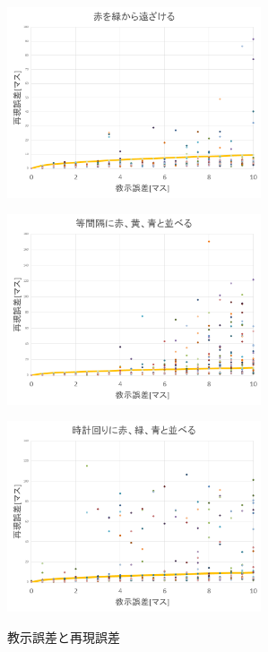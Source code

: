 \begin{figure}[h]
\begin{minipage}[t]{.49\textwidth}
		\label{subfig:unit_c}
	\end{minipage}
	\begin{minipage}[t]{.49\textwidth}
		\centering
		\includegraphics[width=7.5cm]{スライド5.PNG} \\ %
		\label{subfig:unit_d}
	\end{minipage}
	\begin{minipage}[t]{.49\textwidth}
		\centering
		\includegraphics[width=7.5cm]{スライド6.PNG} \\ %
		\label{subfig:unit_d}
	\end{minipage}
	\begin{minipage}[t]{.49\textwidth}
		\centering
		\includegraphics[width=7.5cm]{スライド7.PNG} \\ %
		\label{subfig:unit_d}
	\end{minipage}
	\caption{教示誤差と再現誤差}
	\label{figure:errors}
\end{figure}

